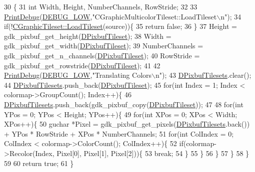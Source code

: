 \begin{DoxyCode}
30                                                                                                            
                       \{
31     \textcolor{keywordtype}{int} Width, Height, NumberChannels, RowStride;
32     
33     \hyperlink{Debug_8h_aa5f00f5537c9760f6ae1782460748ab9}{PrintDebug}(\hyperlink{Debug_8h_a3a5f3fc09784650d8388cb854882f840}{DEBUG\_LOW},\textcolor{stringliteral}{"CGraphicMulticolorTileset::LoadTileset\(\backslash\)n"}); 
34     \textcolor{keywordflow}{if}(!\hyperlink{classCGraphicTileset_a7d47754f26f03958be28a064f54eef1d}{CGraphicTileset::LoadTileset}(source))\{
35         \textcolor{keywordflow}{return} \textcolor{keyword}{false};
36     \}
37     Height = gdk\_pixbuf\_get\_height(\hyperlink{classCGraphicTileset_a5d5adfcdbb347a6df3f57535ca08e3ef}{DPixbufTileset});
38     Width = gdk\_pixbuf\_get\_width(\hyperlink{classCGraphicTileset_a5d5adfcdbb347a6df3f57535ca08e3ef}{DPixbufTileset});
39     NumberChannels = gdk\_pixbuf\_get\_n\_channels(\hyperlink{classCGraphicTileset_a5d5adfcdbb347a6df3f57535ca08e3ef}{DPixbufTileset});
40     RowStride = gdk\_pixbuf\_get\_rowstride(\hyperlink{classCGraphicTileset_a5d5adfcdbb347a6df3f57535ca08e3ef}{DPixbufTileset});
41     
42     \hyperlink{Debug_8h_aa5f00f5537c9760f6ae1782460748ab9}{PrintDebug}(\hyperlink{Debug_8h_a3a5f3fc09784650d8388cb854882f840}{DEBUG\_LOW},\textcolor{stringliteral}{"Translating Colors\(\backslash\)n"}); 
43     \hyperlink{classCGraphicMulticolorTileset_a30809d113b0f314944425a3c8f21408c}{DPixbufTilesets}.clear();
44     \hyperlink{classCGraphicMulticolorTileset_a30809d113b0f314944425a3c8f21408c}{DPixbufTilesets}.push\_back(\hyperlink{classCGraphicTileset_a5d5adfcdbb347a6df3f57535ca08e3ef}{DPixbufTileset});
45     \textcolor{keywordflow}{for}(\textcolor{keywordtype}{int} Index = 1; Index < colormap->GroupCount(); Index++)\{
46         \hyperlink{classCGraphicMulticolorTileset_a30809d113b0f314944425a3c8f21408c}{DPixbufTilesets}.push\_back(gdk\_pixbuf\_copy(\hyperlink{classCGraphicTileset_a5d5adfcdbb347a6df3f57535ca08e3ef}{DPixbufTileset}));
47         
48         \textcolor{keywordflow}{for}(\textcolor{keywordtype}{int} YPos = 0; YPos < Height; YPos++)\{
49             \textcolor{keywordflow}{for}(\textcolor{keywordtype}{int} XPos = 0; XPos < Width; XPos++)\{
50                 guchar *Pixel = gdk\_pixbuf\_get\_pixels(\hyperlink{classCGraphicMulticolorTileset_a30809d113b0f314944425a3c8f21408c}{DPixbufTilesets}.back()) + YPos * 
      RowStride + XPos * NumberChannels;
51                 \textcolor{keywordflow}{for}(\textcolor{keywordtype}{int} ColIndex = 0; ColIndex < colormap->ColorCount(); ColIndex++)\{
52                     \textcolor{keywordflow}{if}(colormap->Recolor(Index, Pixel[0], Pixel[1], Pixel[2]))\{
53                         \textcolor{keywordflow}{break};   
54                     \}
55                 \}
56             \}
57         \}
58     \}
59     
60     \textcolor{keywordflow}{return} \textcolor{keyword}{true};
61 \}
\end{DoxyCode}
